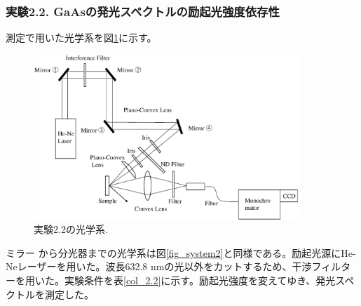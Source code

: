 \documentclass[11pt,a4j]{jsarticle}
\newlength{\circleboxwdht}
\newcommand{\centercircle}[1]{%
  \setlength{\circleboxwdht}{\wd\circlebox}%
  \addtolength{\circleboxwdht}{\dp\circlebox}%
  \raisebox{0.4\dp\circlebox}{%
    \parbox[][\circleboxwdht][c]{\wd\circlebox}{\centering#1}}%
  \llap{\usebox{\circlebox}}%
}	%
\begin{document}

\newpage
\subsubsection{実験2.2. GaAsの発光スペクトルの励起光強度依存性}

測定で用いた光学系を図\ref{fig_system3}に示す。

\begin{figure}[h]
 \centering
 \includegraphics[clip,width=10cm]{start_system3.eps}
 \caption{実験2.2の光学系.}
 \label{fig_system3}
\end{figure}

ミラー\centercircle{3}から分光器までの光学系は図\ref{fig_system2}と同様である。励起光源にHe-Neレーザーを用いた。波長632.8 nmの光以外をカットするため、干渉フィルターを用いた。実験条件を表\ref{col_2.2}に示す。励起光強度を変えてゆき、発光スペクトルを測定した。
\end{document}
